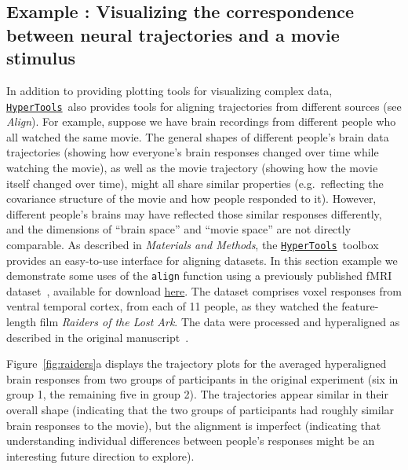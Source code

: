 \documentclass[12pt,letterpaper]{article}
\newcommand{\hypertools}{\href{https://github.com/ContextLab/hypertools}{\texttt{HyperTools}}}
\newcounter{example}
\begin{document}
\subsection*{Example : Visualizing the correspondence between neural trajectories and a movie stimulus}
In addition to providing plotting tools for visualizing complex data, \hypertools~also provides tools for aligning trajectories from different sources (see \textit{Align}).  For example, suppose we have brain recordings from different people who all watched the same movie.  The general shapes of different people's brain data trajectories (showing how everyone's brain responses changed over time while watching the movie), as well as the movie trajectory (showing how the movie itself changed over time), might all share similar properties (e.g.\ reflecting the covariance structure of the movie and how people responded to it).  However, different people's brains may have reflected those similar responses differently, and the dimensions of ``brain space'' and ``movie space'' are not directly comparable.  As described in \textit{Materials and Methods}, the \hypertools~toolbox provides an easy-to-use interface for aligning datasets.  In this section example we demonstrate some uses of the \texttt{align} function using a previously published fMRI dataset~\cite{HaxbEtal11}, available for download \href{https://github.com/HaxbyLab/raiders\_data}{here}. The dataset comprises voxel responses from ventral temporal cortex, from each of 11 people, as they watched the feature-length film \textit{Raiders of the Lost Ark}.  The data were processed and hyperaligned as described in the original manuscript~\cite{HaxbEtal11}.

Figure~\ref{fig:raiders}a displays the trajectory plots for the averaged hyperaligned brain responses from two groups of participants in the original experiment (six in group 1, the remaining five in group 2).  The trajectories appear similar in their overall shape (indicating that the two groups of participants had roughly similar brain responses to the movie), but the alignment is imperfect (indicating that understanding individual differences between people's responses might be an interesting future direction to explore).
\end{document}
